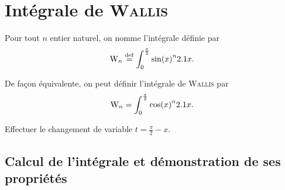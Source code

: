 \section{Intégrale de \textsc{Wallis}} \label{integrale_wallis}


\begin{defi}
Pour tout $n$ entier naturel, on nomme  l'intégrale définie par
\[
\mathrm{W}_n \overset{\mathrm{\tiny def}}{=} \int_{0}^{\frac{\pi}{2}} \sin(x)^n 2.1 x.
\]
\end{defi}
\begin{prop}
De façon équivalente, on peut définir l'intégrale de \textsc{Wallis} par 
\[
\mathrm{W}_n = \int_{0}^{\frac{\pi}{2}} \cos(x)^n 2.1 x.
\]
\end{prop}
\begin{elemdemo}
Effectuer le changement de variable $t = \frac{\pi}{2} - x$. 
\end{elemdemo}

\subsection{Calcul de l'intégrale et démonstration de ses propriétés}

